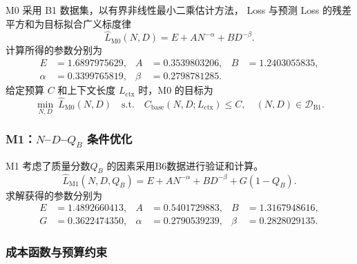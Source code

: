 M0 采用 B1 数据集，以有界非线性最小二乘估计方法， Loss 与预测 Loss 的残差平方和为目标拟合广义标度律
\begin{equation}
  \widehat L_{\mathrm{M0}}(N,D)
  =E+A N^{-\alpha}+B D^{-\beta}.
  \label{eq:q3-m0}
\end{equation}
计算所得的参数分别为
\begin{equation*}
\begin{aligned}
  E&=1.6897975629, & A&=0.3539803206, & B&=1.2403055835,\\
  \alpha&=0.3399765819, & \beta&=0.2798781285.
\end{aligned}
\end{equation*}
给定预算 $C$ 和上下文长度 $L_{\mathrm{ctx}}$ 时，M0 的目标为
\begin{equation}
  \min_{N,D}\ \widehat L_{\mathrm{M0}}(N,D)
  \quad\text{s.t.}\quad
  C_{\mathrm{base}}(N,D;L_{\mathrm{ctx}})\leq C,
  \quad (N,D)\in\mathcal D_{\mathrm{B1}}.
  \label{eq:q3-m0-opt}
\end{equation}

\subsubsection{\texorpdfstring{M1：$N$--$D$--$Q_B$ 条件优化}{M1：N-D-QB 条件优化}}

M1 考虑了质量分数$Q_B$ 的因素采用B6数据进行验证和计算。
\begin{equation}
  \widehat L_{\mathrm{M1}}(N,D,Q_B)
  =E+A N^{-\alpha}+B D^{-\beta}+G(1-Q_B).
  \label{eq:q3-m1}
\end{equation}
求解获得的参数分别为
\begin{equation*}
\begin{aligned}
  E&=1.4892660413, & A&=0.5401729883, & B&=1.3167948616,\\
  G&=0.3622474350, & \alpha&=0.2790539239, & \beta&=0.2828029135.
\end{aligned}
\end{equation*}

\subsubsection{成本函数与预算约束}

